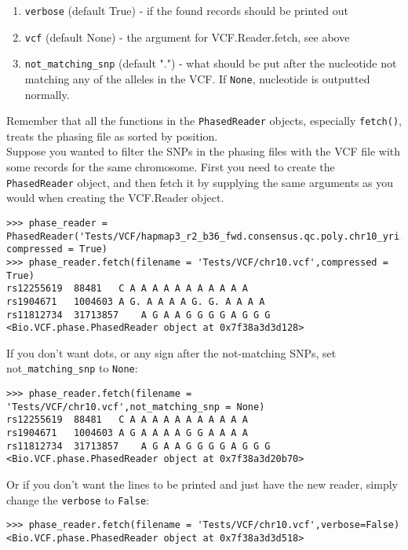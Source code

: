 \begin{enumerate}
  \item \verb|verbose| (default True) - if the found records should be printed out
  \item \verb|vcf| (default None) - the argument for VCF.Reader.fetch, see above
  \item \verb|not_matching_snp| (default ".") - what should be put after the nucleotide not matching any of the alleles in the VCF.
  If \verb|None|, nucleotide is outputted normally.
\end{enumerate}

\noindent Remember that all the functions in the \verb|PhasedReader| objects, especially \verb|fetch()|, treats the phasing file as sorted by position.
\\

\noindent Suppose you wanted to filter the SNPs in the phasing files with the VCF file with some records for the same chromosome.
First you need to create the \verb|PhasedReader| object, and then fetch it by supplying the same arguments as you would when creating the VCF.Reader object.

\begin{verbatim}
>>> phase_reader = PhasedReader('Tests/VCF/hapmap3_r2_b36_fwd.consensus.qc.poly.chr10_yri.D.phased.gz',
compressed = True)
>>> phase_reader.fetch(filename = 'Tests/VCF/chr10.vcf',compressed = True)
rs12255619	88481	C A A A A A A A A A A A
rs1904671	1004603	A G. A A A A G. G. A A A A
rs11812734	31713857	A G A A G G G G A G G G
<Bio.VCF.phase.PhasedReader object at 0x7f38a3d3d128>
\end{verbatim}

\noindent If you don't want dots, or any sign after the not-matching SNPs, set not\verb|_matching_snp| to \verb|None|:

\begin{verbatim}
>>> phase_reader.fetch(filename = 'Tests/VCF/chr10.vcf',not_matching_snp = None)
rs12255619	88481	C A A A A A A A A A A A
rs1904671	1004603	A G A A A A G G A A A A
rs11812734	31713857	A G A A G G G G A G G G
<Bio.VCF.phase.PhasedReader object at 0x7f38a3d20b70>
\end{verbatim}

\noindent Or if you don't want the lines to be printed and just have the new reader, simply change the \verb|verbose| to \verb|False|:

\begin{verbatim}
>>> phase_reader.fetch(filename = 'Tests/VCF/chr10.vcf',verbose=False)
<Bio.VCF.phase.PhasedReader object at 0x7f38a3d3d518>
\end{verbatim}

